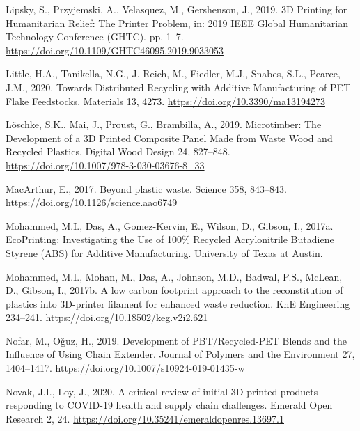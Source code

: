 \documentclass[
  12pt,
  number,
  review]{elsarticle}
\newlength{\cslhangindent}
\newlength{\cslentryspacingunit} %
\newenvironment{CSLReferences}[2] %
 {%
  \setlength{\parindent}{0pt}
  \ifodd #1
  \let\oldpar\par
  \def\par{\hangindent=\cslhangindent\oldpar}
  \fi
  \setlength{\parskip}{#2\cslentryspacingunit}
 }%
 {}
\begin{document}
\begin{CSLReferences}{1}{0}
\leavevmode{}%
Lipsky, S., Przyjemski, A., Velasquez, M., Gershenson, J., 2019. {3D
Printing} for {Humanitarian Relief}: {The Printer Problem}, in: 2019
{IEEE Global Humanitarian Technology Conference} ({GHTC}). pp. 1--7.
\url{https://doi.org/10.1109/GHTC46095.2019.9033053}

\leavevmode{}%
Little, H.A., Tanikella, N.G., J. Reich, M., Fiedler, M.J., Snabes,
S.L., Pearce, J.M., 2020. Towards {Distributed Recycling} with {Additive
Manufacturing} of {PET Flake Feedstocks}. Materials 13, 4273.
\url{https://doi.org/10.3390/ma13194273}

\leavevmode{}%
Löschke, S.K., Mai, J., Proust, G., Brambilla, A., 2019. Microtimber:
{The Development} of a {3D Printed Composite Panel Made} from {Waste
Wood} and {Recycled Plastics}. Digital Wood Design 24, 827--848.
\url{https://doi.org/10.1007/978-3-030-03676-8_33}

\leavevmode{}%
MacArthur, E., 2017. Beyond plastic waste. Science 358, 843--843.
\url{https://doi.org/10.1126/science.aao6749}

\leavevmode{}%
Mohammed, M.I., Das, A., Gomez-Kervin, E., Wilson, D., Gibson, I.,
2017a. {EcoPrinting}: {Investigating} the {Use} of 100\% {Recycled
Acrylonitrile Butadiene Styrene} ({ABS}) for {Additive Manufacturing}.
{University of Texas at Austin}.

\leavevmode{}%
Mohammed, M.I., Mohan, M., Das, A., Johnson, M.D., Badwal, P.S., McLean,
D., Gibson, I., 2017b. A low carbon footprint approach to the
reconstitution of plastics into {3D-printer} filament for enhanced waste
reduction. KnE Engineering 234--241.
\url{https://doi.org/10.18502/keg.v2i2.621}

\leavevmode{}%
Nofar, M., Oğuz, H., 2019. Development of {PBT}/{Recycled-PET Blends}
and the {Influence} of {Using Chain Extender}. Journal of Polymers and
the Environment 27, 1404--1417.
\url{https://doi.org/10.1007/s10924-019-01435-w}

\leavevmode{}%
Novak, J.I., Loy, J., 2020. A critical review of initial {3D} printed
products responding to {COVID-19} health and supply chain challenges.
Emerald Open Research 2, 24.
\url{https://doi.org/10.35241/emeraldopenres.13697.1}


\end{CSLReferences}
\end{document}

